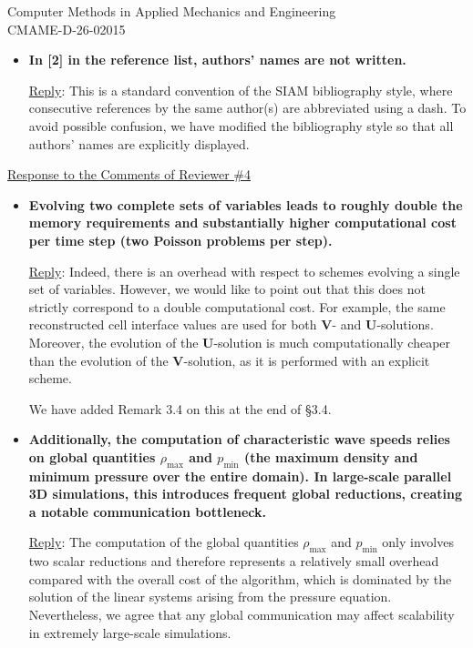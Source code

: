 \documentclass[letter,11pt]{letter}
\theoremstyle{remark}
\begin{document}
\begin{letter}{Computer Methods in Applied Mechanics and Engineering\\
CMAME-D-26-02015}
\begin{itemize}[wide, labelwidth=!, labelindent=0pt]
\begin{itemize}[wide, labelwidth=!, labelindent=0pt]
To avoid possible confusion, we have added a short clarification in the revised manuscript.

\medskip
\item{\bf In [2] in the reference list, authors' names are not written.}

\smallskip
{\sc\underline{Reply}}: This is a standard convention of the SIAM bibliography style, where consecutive references by the same author(s) are
abbreviated using a dash. To avoid possible confusion, we have modified the bibliography style so that all authors' names are explicitly
displayed.
\end{itemize}
\end{itemize}

\bigskip
\underline{Response to the Comments of Reviewer \#4}

\begin{itemize}[wide, labelwidth=!, labelindent=0pt]
\item{\bf Evolving two complete sets of variables leads to roughly double the memory requirements and substantially higher computational
cost per time step (two Poisson problems per step).}
	
\smallskip
{\sc\underline{Reply}}: Indeed, there is an overhead with respect to schemes evolving a single set of variables. However, we would like to
point out that this does not strictly correspond to a double computational cost. For example, the same reconstructed cell interface values
are used for both $\bm V$- and $\bm U$-solutions. Moreover, the evolution of the $\bm U$-solution is much computationally cheaper than the
evolution of the $\bm V$-solution, as it is performed with an explicit scheme.

\smallskip
We have added Remark 3.4 on this at the end of \S3.4.
	
\medskip
\item{\bf Additionally, the computation of characteristic wave speeds relies on global quantities $\rho_{\max}$ and $p_{\min}$ (the maximum
density and minimum pressure over the entire domain). In large-scale parallel 3D simulations, this introduces frequent global reductions,
creating a notable communication bottleneck.}
	
\smallskip
{\sc\underline{Reply}}: The computation of the global quantities $\rho_{\max}$ and $p_{\min}$ only involves two scalar reductions and
therefore represents a relatively small overhead compared with the overall cost of the algorithm, which is dominated by the solution of the
linear systems arising from the pressure equation. Nevertheless, we agree that any global communication may affect scalability in extremely
large-scale simulations.
	

\end{itemize}
\end{letter}
\end{document}
